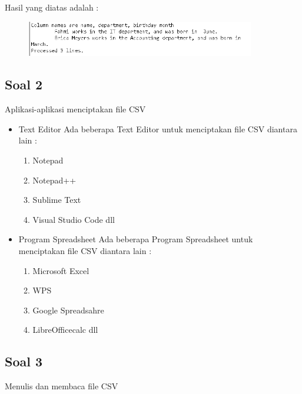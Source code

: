 Hasil yang diatas adalah : 
	\begin{figure}[H]
		\includegraphics[width=10cm]{figures/4/1174021/Teori/7.png}
		\centering
	\end{figure}

\subsection{Soal 2}
Aplikasi-aplikasi menciptakan file CSV

\begin{itemize}
	\item Text Editor
	Ada beberapa Text Editor untuk menciptakan file CSV diantara lain : 
	\begin{enumerate}
		\item Notepad
		\item Notepad++
		\item Sublime Text
		\item Visual Studio Code
		dll	
	\end{enumerate}

	\item Program Spreadsheet 
	Ada beberapa Program Spreadsheet untuk menciptakan file CSV diantara lain : 
	\begin{enumerate}
		\item Microsoft Excel
		\item WPS
		\item Google Spreadsahre
		\item LibreOfficecalc 
		dll	
	\end{enumerate}
\end{itemize}

\subsection{Soal 3}
Menulis dan membaca file CSV

